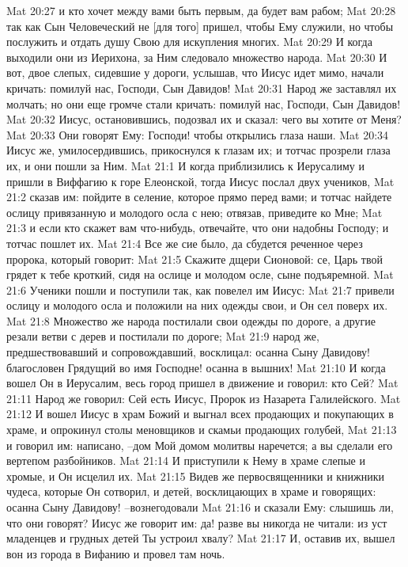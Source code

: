 Mat 20:27  и кто хочет между вами быть первым, да будет вам рабом;
Mat 20:28  так как Сын Человеческий не [для того] пришел, чтобы Ему служили, но чтобы послужить и отдать душу Свою для искупления многих.
Mat 20:29  И когда выходили они из Иерихона, за Ним следовало множество народа.
Mat 20:30  И вот, двое слепых, сидевшие у дороги, услышав, что Иисус идет мимо, начали кричать: помилуй нас, Господи, Сын Давидов!
Mat 20:31  Народ же заставлял их молчать; но они еще громче стали кричать: помилуй нас, Господи, Сын Давидов!
Mat 20:32  Иисус, остановившись, подозвал их и сказал: чего вы хотите от Меня?
Mat 20:33  Они говорят Ему: Господи! чтобы открылись глаза наши.
Mat 20:34  Иисус же, умилосердившись, прикоснулся к глазам их; и тотчас прозрели глаза их, и они пошли за Ним.
Mat 21:1  И когда приблизились к Иерусалиму и пришли в Виффагию к горе Елеонской, тогда Иисус послал двух учеников,
Mat 21:2  сказав им: пойдите в селение, которое прямо перед вами; и тотчас найдете ослицу привязанную и молодого осла с нею; отвязав, приведите ко Мне;
Mat 21:3  и если кто скажет вам что-нибудь, отвечайте, что они надобны Господу; и тотчас пошлет их.
Mat 21:4  Все же сие было, да сбудется реченное через пророка, который говорит:
Mat 21:5  Скажите дщери Сионовой: се, Царь твой грядет к тебе кроткий, сидя на ослице и молодом осле, сыне подъяремной.
Mat 21:6  Ученики пошли и поступили так, как повелел им Иисус:
Mat 21:7  привели ослицу и молодого осла и положили на них одежды свои, и Он сел поверх их.
Mat 21:8  Множество же народа постилали свои одежды по дороге, а другие резали ветви с дерев и постилали по дороге;
Mat 21:9  народ же, предшествовавший и сопровождавший, восклицал: осанна Сыну Давидову! благословен Грядущий во имя Господне! осанна в вышних!
Mat 21:10  И когда вошел Он в Иерусалим, весь город пришел в движение и говорил: кто Сей?
Mat 21:11  Народ же говорил: Сей есть Иисус, Пророк из Назарета Галилейского.
Mat 21:12  И вошел Иисус в храм Божий и выгнал всех продающих и покупающих в храме, и опрокинул столы меновщиков и скамьи продающих голубей,
Mat 21:13  и говорил им: написано, --дом Мой домом молитвы наречется; а вы сделали его вертепом разбойников.
Mat 21:14  И приступили к Нему в храме слепые и хромые, и Он исцелил их.
Mat 21:15  Видев же первосвященники и книжники чудеса, которые Он сотворил, и детей, восклицающих в храме и говорящих: осанна Сыну Давидову! --вознегодовали
Mat 21:16  и сказали Ему: слышишь ли, что они говорят? Иисус же говорит им: да! разве вы никогда не читали: из уст младенцев и грудных детей Ты устроил хвалу?
Mat 21:17  И, оставив их, вышел вон из города в Вифанию и провел там ночь.
